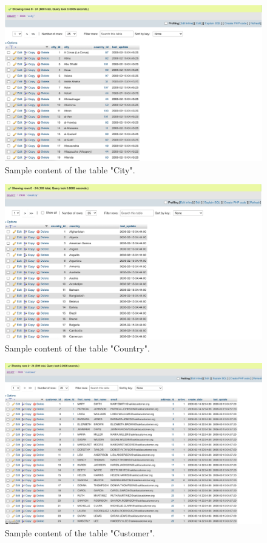 \documentclass{article}
\begin{document}
		\begin{figure}[H]
			\includegraphics[width=\textwidth]{city_content}
			\caption{Sample content of the table "City".}
		\end{figure}
		\begin{figure}[H]
			\includegraphics[width=\textwidth]{country_content}
			\caption{Sample content of the table "Country".}
		\end{figure}
		\begin{figure}[H]
			\includegraphics[width=\textwidth]{customer_content}
			\caption{Sample content of the table "Customer".}
		\end{figure}
\end{document}
